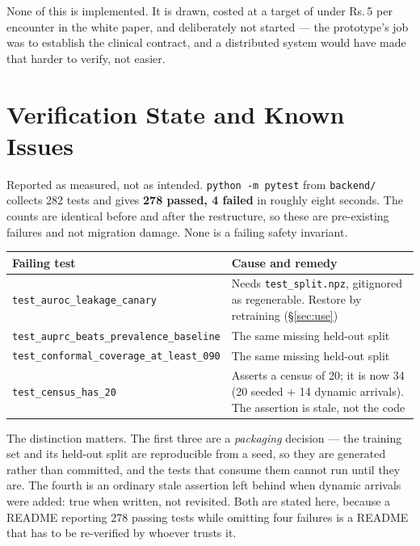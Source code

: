 \documentclass[10pt,a4paper,twocolumn]{article}
\newcommand{\pth}[1]{\textcolor{SecPurple}{\texttt{#1}}}
\newcommand{\cm}[1]{\texttt{#1}}
\begin{document}
None of this is implemented. It is drawn, costed at a target of under Rs.\,5 per encounter in the
white paper, and deliberately not started --- the prototype's job was to establish the clinical
contract, and a distributed system would have made that harder to verify, not easier.

\section{Verification State and Known Issues}
\label{sec:state}

Reported as measured, not as intended. \cm{python -m pytest} from \pth{backend/} collects 282 tests
and gives \textbf{278 passed, 4 failed} in roughly eight seconds. The counts are identical before
and after the restructure, so these are pre-existing failures and not migration damage. None is a
failing safety invariant.

\begin{center}\footnotesize\sffamily
\begin{tabular}{@{}p{3.2cm}p{4.6cm}@{}}
\toprule
\rowcolor{AccPurple!10}
\textbf{Failing test} & \textbf{Cause and remedy}\\
\midrule
\cm{test\_auroc\_}\newline\cm{leakage\_canary} & Needs \cm{test\_split.npz}, gitignored as regenerable. Restore by retraining (\S\ref{sec:use})\\
\addlinespace[2pt]
\cm{test\_auprc\_beats\_}\newline\cm{prevalence\_baseline} & The same missing held-out split\\
\addlinespace[2pt]
\cm{test\_conformal\_}\newline\cm{coverage\_at\_least\_090} & The same missing held-out split\\
\addlinespace[2pt]
\cm{test\_census\_has\_20} & Asserts a census of 20; it is now 34 (20 seeded + 14 dynamic arrivals). The assertion is stale, not the code\\
\bottomrule
\end{tabular}
\end{center}

\vspace{4pt}
The distinction matters. The first three are a \emph{packaging} decision --- the training set and
its held-out split are reproducible from a seed, so they are generated rather than committed, and
the tests that consume them cannot run until they are. The fourth is an ordinary stale assertion
left behind when dynamic arrivals were added: true when written, not revisited. Both are stated
here, because a README reporting 278 passing tests while omitting four failures is a README that
has to be re-verified by whoever trusts it.
\end{document}

